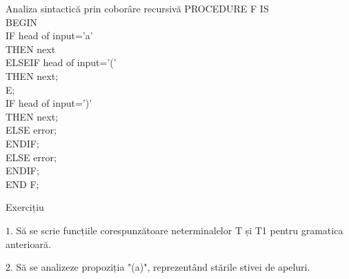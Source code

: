 \documentclass[pdf]{beamer}
\begin{document}
\begin{frame}{Analiza sintactică prin coborâre recursivă}
PROCEDURE F IS\\
BEGIN \\
\hspace{1cm} IF \hspace{1cm} head of input='a'\\
\hspace{1cm} THEN next\\
\hspace{1cm} ELSEIF head of input='('\\
\hspace{1cm} THEN next;\\
\hspace{1cm} 	\hspace*{1cm} E; \\
\hspace{1cm} 	\hspace*{1cm} IF \hspace*{1cm} head of input=')'\\
\hspace{1cm} 	\hspace*{1cm} THEN next;\\
\hspace{1cm} 	\hspace*{1cm} ELSE error;\\
\hspace{1cm} 	\hspace*{1cm} ENDIF;\\
\hspace{1cm} ELSE error;\\
\hspace{1cm} ENDIF;\\
END F;
\end{frame}



\begin{frame}{Exercițiu}

$1$. Să se scrie funcțiile corespunzătoare neterminalelor T și T1 pentru gramatica anterioară.

$2$. Să se analizeze propoziția "(a)", reprezentând stările stivei de apeluri.

\end{frame}
\end{document}
